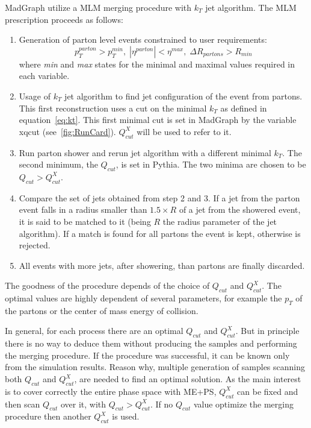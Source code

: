 MadGraph utilize a MLM merging procedure with $k_{T}$ jet algorithm. The MLM prescription proceeds as follows:
\begin{enumerate}
\item Generation of parton level events constrained to user requirements:
  \begin{equation*}
    p_{T}^{parton}>p_{T}^{min}, \; |\eta^{parton}|<\eta^{max}, \; \Delta R_{partons}>R_{min}
  \end{equation*} where \textit{min} and \textit{max} states for the minimal and maximal values required in each variable.
\item Usage of $k_{T}$ jet algorithm to find jet configuration of the event from partons. This first reconstruction uses a cut on the minimal $k_{T}$ as defined in equation~\ref{eq:kt}. This first minimal cut is set in MadGraph by the variable xqcut (see~\ref{fig:RunCard}). $Q^{X}_{cut}$ will be used to refer to it.
\item Run parton shower and rerun jet algorithm with a different minimal $k_{T}$. The second minimum, the $Q_{cut}$, is set in Pythia. The two minima are chosen to be $Q_{cut}>Q^{X}_{cut}$.
\item Compare the set of jets obtained from step 2 and 3. If a jet from the parton event falls in a radius smaller than $1.5 \times R$ of a jet from the showered event, it is said to be matched to it (being $R$ the radius parameter of the jet algorithm). If a match is found for all partons the event is kept, otherwise is rejected.
\item All events with more jets, after showering, than partons are finally discarded.   
\end{enumerate}

The goodness of the procedure depends of the choice of $Q_{cut}$ and $Q^{X}_{cut}$. The optimal values are highly dependent of several parameters, for example the $p_{T}$ of the partons or the center of mass energy of collision. 

In general, for each process there are an optimal $Q_{cut}$ and $Q^{X}_{cut}$. But in principle there is no way to deduce them without producing the samples and performing the merging procedure. If the procedure was successful, it can be known only from the simulation results. Reason why, multiple generation of samples scanning both $Q_{cut}$ and $Q^{X}_{cut}$, are needed to find an optimal solution. As the main interest is to cover correctly the entire phase space with ME+PS, $Q^{X}_{cut}$ can be fixed and then scan $Q_{cut}$ over it, with $Q_{cut}>Q^{X}_{cut}$. If no $Q_{cut}$ value optimize the merging procedure then another $Q^{X}_{cut}$ is used. 

